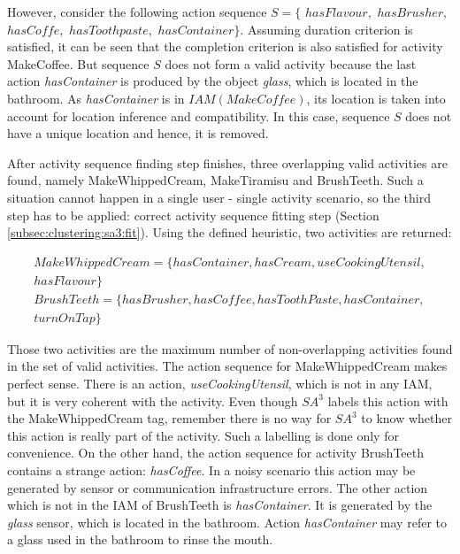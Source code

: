 However, consider the following action sequence $S = \{$ $hasFlavour,$ $hasBrusher,$ $hasCoffe,$ $hasToothpaste,$ $hasContainer\}$. Assuming duration criterion is satisfied, it can be seen that the completion criterion is also satisfied for activity MakeCoffee. But sequence $S$ does not form a valid activity because the last action \textit{hasContainer} is produced by the object \textit{glass}, which is located in the bathroom. As \textit{hasContainer} is in $IAM(MakeCoffee)$, its location is taken into account for location inference and compatibility. In this case, sequence $S$ does not have a unique location and hence, it is removed. 

After activity sequence finding step finishes, three overlapping valid activities are found, namely MakeWhippedCream, MakeTiramisu and BrushTeeth. Such a situation cannot happen in a single user - single activity scenario, so the third step has to be applied: correct activity sequence fitting step (Section \ref{subsec:clustering:sa3:fit}). Using the defined heuristic, two activities are returned:

\begin{equation*}
  \begin{split}   
  MakeWhippedCream = \{hasContainer, hasCream, useCookingUtensil,\\ 
  hasFlavour\} \\
  BrushTeeth = \{hasBrusher, hasCoffee, hasToothPaste, hasContainer,\\ 
  turnOnTap\} 
  \end{split}
 \end{equation*} 

Those two activities are the maximum number of non-overlapping activities found in the set of valid activities. The action sequence for MakeWhippedCream makes perfect sense. There is an action, \textit{useCookingUtensil}, which is not in any IAM, but it is very coherent with the activity. Even though $SA^3$ labels this action with the MakeWhippedCream tag, remember there is no way for $SA^3$ to know whether this action is really part of the activity. Such a labelling is done only for convenience. On the other hand, the action sequence for activity BrushTeeth contains a strange action: \textit{hasCoffee}. In a noisy scenario this action may be generated by sensor or communication infrastructure errors. The other action which is not in the IAM of BrushTeeth is \textit{hasContainer}. It is generated by the \textit{glass} sensor, which is located in the bathroom. Action \textit{hasContainer} may refer to a glass used in the bathroom to rinse the mouth. 